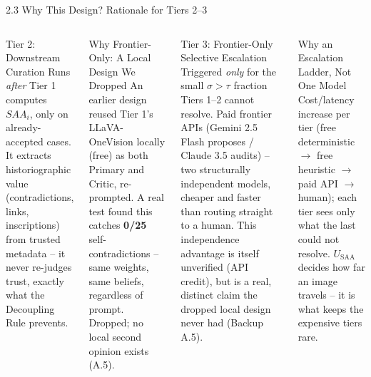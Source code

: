 \documentclass[aspectratio=169,11pt]{beamer}
\begin{document}
\begin{frame}{2.3 Why This Design? Rationale for Tiers 2--3}
\scriptsize
\begin{columns}[T]
\begin{block}{Tier 2: Downstream Curation}
Runs \emph{after} Tier 1 computes $SAA_i$, only on already-accepted cases. It extracts historiographic value (contradictions, links, inscriptions) from trusted metadata -- it never re-judges trust, exactly what the Decoupling Rule prevents.
\end{block}
\begin{block}{Why Frontier-Only: A Local Design We Dropped}
\scriptsize An earlier design reused Tier 1's LLaVA-OneVision locally (free) as both Primary and Critic, re-prompted. A real test found this catches \textbf{0/25} self-contradictions -- same weights, same beliefs, regardless of prompt. Dropped; no local second opinion exists (A.5).
\end{block}

\begin{block}{Tier 3: Frontier-Only Selective Escalation}
Triggered \emph{only} for the small $\sigma > \tau$ fraction Tiers 1--2 cannot resolve. Paid frontier APIs (Gemini 2.5 Flash proposes / Claude 3.5 audits) -- two structurally independent models, cheaper and faster than routing straight to a human. This independence advantage is itself unverified (API credit), but is a real, distinct claim the dropped local design never had (Backup A.5).
\end{block}
\begin{block}{Why an Escalation Ladder, Not One Model}
Cost/latency increase per tier (free deterministic $\to$ free heuristic $\to$ paid API $\to$ human); each tier sees only what the last could not resolve. $U_{\text{SAA}}$ decides how far an image travels -- it is what keeps the expensive tiers rare.
\end{block}
\end{columns}
\end{frame}
\end{document}
